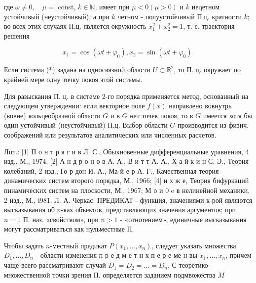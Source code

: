 \documentclass[10pt]{article}
\begin{document}
где $\omega \neq 0, \quad \mu=$ const, $k \in \mathbb{N}$, имеет при $\mu<0(\mu>0)$ и $k$ неqетном устойчивый (неустойчивый), а при $k$ четном - полуустойчивый П.ц. кратности $k$; во всех этих случаях П.ц. является окружность $x_{1}^{2}+x_{2}^{2}=1$, т. е. траектория решения



\[

x_{1}=\cos \left(\omega t+\varphi_{0}\right), x_{2}=\sin \left(\omega t+\varphi_{0}\right) .

\]



Если система (*) задана на односвязной области $U \subset \mathbb{R}^{2}$, то П. ц. окружает по крайней мере одну точку покоя этой системы.



Для разыскания П. ц. в системе 2-го порядка применяется метод, основанный на следующем утверждении: если векторное поле $f(x)$ направлено вовнутрь (вовне) кольцеобразной области $G$ и в $G$ нет точек покоя, то в $G$ имеется хотя бы один устойчивый (неустойчивый) П.ц. Выбор области $G$ производится из физич. соображений или результатов аналитических или численных расчетов.



Лuт.: [1] П о н т р я г и в Л. С., Обыкновенные дифференциальные уравнения, 4 изд., М., 1974; [2] А н д р о н о в А. А., В и т т А. А., Х а й к и н С. Э., Теория колебаний, 2 изд., Го р дон И. А., Ма й е р А. Г., Качественная теория динамических систем второго порядка, М., 1966; [4] и х ж е, Теория бифуркаций пинамических систем на плоскости, М., 1967; М о и 0 e в нелинейной механики, 2 изд., М., і981. Л. А. Черкас. ПРЕДИКАТ - функция, значениями к-рой являются высказывания об $n$-ках объектов, представляющих значения аргументов; при $n=1$ П. наз. «свойством», при $n>1$ - «отнотением», единичные высказывания могут рассматриваться как нульместные П.



Чтобы задать $n$-местный предикат $P\left(x_{1}, \ldots, x_{n}\right)$, следует указать множества $D_{1}, \ldots, D_{n}$ - области изменения п р е д м е т н х п е р е ме н вы $x_{1}, \ldots, x_{n}$, причем чаще всего рассматривают случай $D_{1}=D_{2}=\ldots=D_{n}$. С теоретико-множественной точки зрения П. определяется заданием подмвожества $M$
\end{document}
